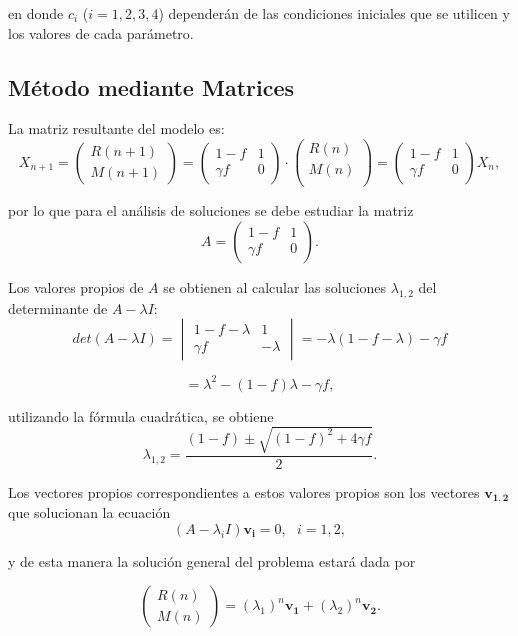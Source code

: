 en donde $c_{i}$ ($i=1,2,3,4$) dependerán de las condiciones iniciales que se utilicen y los valores de cada parámetro.

\subsection{Método mediante Matrices}

La matriz resultante del modelo es:
$$X_{n+1}=\begin{pmatrix}
    R(n+1) \\
    M(n+1) 
    \end{pmatrix}=
    \begin{pmatrix}
    1-f & 1\\
    \gamma f & 0 
    \end{pmatrix} \cdot 
    \begin{pmatrix}
    R(n) \\
    M(n) \\
    \end{pmatrix}=
    \begin{pmatrix}
        1-f & 1\\
        \gamma f & 0 
        \end{pmatrix} X_n,$$

por lo que para el análisis de soluciones se debe estudiar la matriz
$$A=\begin{pmatrix}
    1-f & 1\\
    \gamma f & 0 
    \end{pmatrix}.$$

Los valores propios de $A$ se obtienen al calcular las soluciones $\lambda_{1,2}$ del determinante de $A-\lambda I$:
$$det(A-\lambda I) = \begin{vmatrix}
    1-f-\lambda & 1\\
    \gamma f & -\lambda 
    \end{vmatrix} = -\lambda(1-f-\lambda)-\gamma f$$

$$=\lambda^2-(1-f)\lambda-\gamma f,$$

utilizando la fórmula cuadrática, se obtiene
$$\lambda_{1,2}=\dfrac{(1-f)\pm\sqrt{(1-f)^2+4\gamma f}}{2}.$$

Los vectores propios correspondientes a estos valores propios son los vectores $\mathbf{v_{1,2}}$ que solucionan la ecuación
$$(A-\lambda_i I)\mathbf{v_i}=0, \:\:\: i=1,2,$$

y de esta manera la solución general del problema estará dada por

$$\begin{pmatrix}
    R(n) \\
    M(n) 
    \end{pmatrix}= (\lambda_1)^n \mathbf{v_1}+(\lambda_2)^n \mathbf{v_2}.$$


